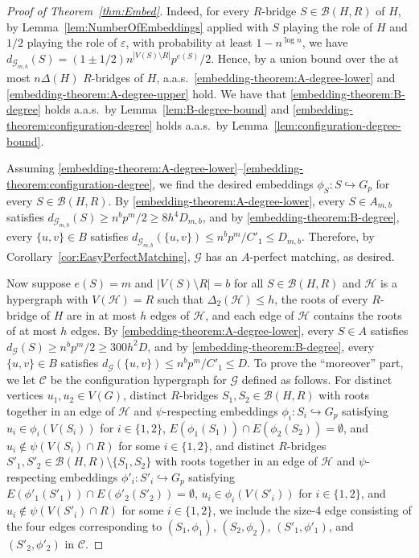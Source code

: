 \documentclass[11pt]{article}
\numberwithin{equation}{section}
\newcommand{\eps}{\varepsilon}
\newcounter{i}
\theoremstyle{plain}
\theoremstyle{plain} %
\theoremstyle{definition}
\newcommand{\cC}{\mathcal{C}}
\newcommand{\cB}{\mathcal{B}}
\newcommand{\cH}{\mathcal{H}}
\newcommand{\cG}{\mathcal{G}}
\newcommand{\aas}{a.a.s.\ }
\begin{document}
\begin{proof}[Proof of Theorem~\ref{thm:Embed}]
Indeed, for every $R$-bridge $S \in \cB(H, R)$ of $H$, by Lemma~\ref{lem:NumberOfEmbeddings} applied with $S$ playing the role of $H$ and $1/2$ playing the role of $\eps$, with probability at least $1 - n^{\log n}$, we have $d_{\cG_{m,b}}(S) = (1\pm1/2)n^{|V(S)\setminus R|}p^{e(S)} / 2$.  Hence, by a union bound over the at most $n\Delta(H)$ $R$-bridges of $H$, \aas \ref{embedding-theorem:A-degree-lower} and \ref{embedding-theorem:A-degree-upper} hold. 
We have that \ref{embedding-theorem:B-degree} holds \aas by Lemma~\ref{lem:B-degree-bound} and \ref{embedding-theorem:configuration-degree} holds \aas by Lemma~\ref{lem:configuration-degree-bound}.


Assuming \ref{embedding-theorem:A-degree-lower}--\ref{embedding-theorem:configuration-degree}, we find the desired embeddings $\phi_S : S \hookrightarrow G_p$ for every $S \in \cB(H, R)$.  By \ref{embedding-theorem:A-degree-lower}, every $S \in A_{m,b}$ satisfies $d_{\cG_{m,b}}(S) \geq n^b p^m / 2 \geq 8h^4 D_{m,b}$, and by \ref{embedding-theorem:B-degree}, every $\{u,v\}\in B$ satisfies $d_{\cG_{m,b}}(\{u,v\}) \leq n^bp^m / C'_1 \leq D_{m,b}$.  
Therefore, by Corollary~\ref{cor:EasyPerfectMatching}, $\cG$ has an $A$-perfect matching, as desired.

Now suppose $e(S) = m$ and $|V(S)\setminus R| = b$ for all $S \in \cB(H,R)$ and
$\cH$ is a hypergraph with $V(\cH) = R$ such that $\Delta_2(\cH) \leq h$, the roots of every $R$-bridge of $H$ are in at most $h$ edges of $\cH$, and each edge of $\cH$ contains the roots of at most $h$ edges. 
By \ref{embedding-theorem:A-degree-lower}, every $S \in A$ satisfies $d_{\cG}(S) \geq n^b p^m / 2 \geq 300 h^2 D$, and by \ref{embedding-theorem:B-degree}, every $\{u,v\}\in B$ satisfies $d_{\cG}(\{u,v\}) \leq n^bp^m / C'_1 \leq D$. 
To prove the ``moreover'' part, we let $\cC$ be the configuration hypergraph for $\cG$ defined as follows.  For distinct vertices $u_1, u_2\in V(G)$, distinct $R$-bridges $S_1,S_2 \in \cB(H,R)$ with roots together in an edge of $\cH$ and $\psi$-respecting embeddings $\phi_i : S_i \hookrightarrow G_p$ satisfying $u_i \in \phi_i(V(S_i))$ for $i \in \{1,2\}$, $E(\phi_1(S_1)) \cap E(\phi_2(S_2)) = \emptyset$, and $u_i \notin \psi(V(S_i) \cap R)$ for some $i \in \{1,2\}$, and distinct $R$-bridges $S'_1,S'_2 \in \cB(H,R)\setminus\{S_1,S_2\}$ with roots together in an edge of $\cH$ and $\psi$-respecting embeddings $\phi'_i : S'_i \hookrightarrow G_p$ satisfying $E(\phi'_1(S'_1)) \cap E(\phi'_2(S'_2)) = \emptyset$, $u_i \in \phi_i(V(S'_i))$ for $i \in \{1,2\}$, and $u_i \notin \psi(V(S'_i) \cap R)$ for some $i \in \{1,2\}$, we include the size-4 edge consisting of the four edges corresponding to $(S_1, \phi_1)$, $(S_2, \phi_2)$, $(S'_1, \phi'_1)$, and $(S'_2, \phi'_2)$ in $\cC$.


\end{proof}
\end{document}
